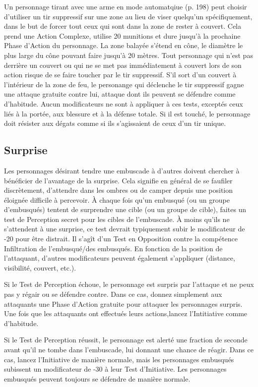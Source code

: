 Un personnage tirant avec une arme en mode automatqiue (p. 198) peut choisir d'utiliser un tir suppressif sur une zone au lieu de viser quelqu'un spécifiquement, dans le but de forcer tout ceux qui sont dans la zone de rester à couvert. Cela prend une Action Complexe, utilise 20 munitions et dure jusqu'à la prochaine Phase d'Action du personnage. La zone balayée s'étend en cône, le diamètre le plus large du cône pouvant faire jusqu'à 20 mètres. Tout personnage qui n'est pas derrière un couvert ou qui ne se met pas immédiatement à couvert lors de son action risque de se faire toucher par le tir suppressif. S'il sort d'un couvert à l'intérieur de la zone de feu, le personange qui déclenche le tir suppressif gagne une attaque gratuite contre lui, attaque dont ils peuvent se défendre comme d'habitude. Aucun modificateurs ne sont à appliquer à ces tests, exceptés ceux liés à la portée, aux blessure et à la défense totale. Si il est touché, le personnage doit résister aux dégats comme si ils s'agissaient de ceux d'un tir unique. 

\subsection{Surprise} \label{sec:surprise} 

Les personnages désirant tendre une embuscade à d'autres doivent chercher à bénéficier de l'avantage de la surprise. Cela signifie en général de se faufiler discrètement, d'attendre dans les ombres ou de camper depuis une position éloignée difficile à percevoir. À chaque fois qu'un embusqué (ou un groupe d'embusqués) tentent de surprendre une cible (ou un groupe de cible), faites un test de Perception secret pour les cibles de l'embuscade. À moins qu'ils ne s'attendent à une surprise, ce test devrait typiquement subir le modificateur de -20 pour être distrait. Il s'agît d'un Test en Opposition contre la compétence Infiltration de l'embusqué/des embusqués. En fonction de la position de l'attaquant, d'autres modificateurs peuvent également s'appliquer (distance, visibilité, couvert, etc.). 

Si le Test de Perception échoue, le personnage est surpris par l'attaque et ne peux pas y régair ou se défendre contre. Dans ce cas, donnez simplement aux attaquants une Phase d'Action gratuite pour attaquer les personnages surpris. Une fois que les attaquants ont effectués leurs actions,lancez l'Intitiative comme d'habitude. 

Si le Test de Perception réussit, le personnage est alerté une fraction de seconde avant qu'il ne tombe dans l'embuscade, lui donnant une chance de réagir. Dans ce cas, lancez l'Initiative de manière normale, mais les personnages embusqués subissent un modificateur de -30 à leur Test d'Initiative. Les personnages embusqués peuvent toujours se défendre de manière normale. 

